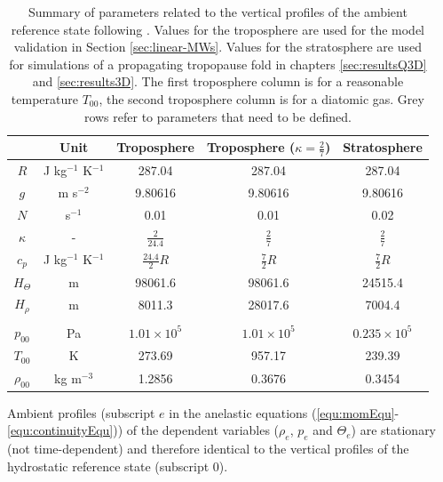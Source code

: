 \begin{table}[ht]
\centering
\caption{Summary of parameters related to the vertical profiles of the ambient reference state following \textcite[]{bacmeister_breakdown_1989}. Values for the troposphere are used for the model validation in Section \ref{sec:linear-MWs}. Values for the stratosphere are used for simulations of a propagating tropopause fold in chapters \ref{sec:resultsQ3D} and \ref{sec:results3D}. The first troposphere column is for a reasonable temperature $T_{00}$, the second troposphere column is for a diatomic gas. Grey rows refer to parameters that need to be defined.}
\begin{tabular}{@{}ccccc@{}}
\toprule
 & Unit & Troposphere & Troposphere ($\kappa=\frac{2}{7}$) & Stratosphere \\ \midrule[1pt]

 \rowcolor{LightCyan} $R$ & J kg$^{-1}$ K$^{-1}$ &   \cellcolor{LightCyan} 287.04 &   \cellcolor{LightCyan} 287.04 &   \cellcolor{LightCyan} 287.04 \\
 \rowcolor{LightCyan} $g$ & m s$^{-2}$ & \cellcolor{LightCyan} 9.80616 & \cellcolor{LightCyan} 9.80616 & \cellcolor{LightCyan} 9.80616 \\
 \rowcolor{LightCyan} $N$ & s$^{-1}$ & \cellcolor{LightCyan} 0.01 & \cellcolor{LightCyan} 0.01 & \cellcolor{LightCyan} 0.02 \\
\rowcolor{LightCyan} $\kappa$ & - & $\frac{2}{24.4}$ & $ \frac{2}{7}$ & $ \frac{2}{7}$ \\
$c_p$ & J kg$^{-1}$ K$^{-1}$ & $\frac{24.4}{2} R$ & $\frac{7}{2} R$ & $\frac{7}{2} R$ \\
$H_{\Theta}$ & m & 98061.6 & 98061.6 & 24515.4  \\
$H_{\rho}$ & m & 8011.3  & 28017.6  & 7004.4 \\

& & & & \\
\rowcolor{LightCyan} $p_{00}$ & Pa & \cellcolor{LightCyan} $1.01 \times 10^5$ & \cellcolor{LightCyan} $1.01 \times 10^5$ & \cellcolor{LightCyan} $0.235 \times 10^5$ \\
$T_{00}$ & K & 273.69 & 957.17 & 239.39 \\
$\rho_{00}$ & kg m$^{-3}$ & 1.2856 & 0.3676 & 0.3454 \\

\bottomrule
\end{tabular}
\label{tab:ambientProfiles}
\end{table}

Ambient profiles (subscript $e$ in the anelastic equations (\ref{equ:momEqu}-\ref{equ:continuityEqu})) of the dependent variables ($\rho_e$, $p_e$ and $\Theta_e$) are stationary (not time-dependent) and therefore identical to the vertical profiles of the hydrostatic reference state (subscript 0).

